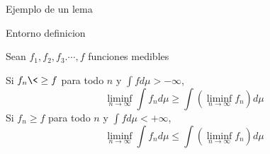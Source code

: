 \documentclass[]{beamer}
\theoremstyle{plain}
\begin{document}
\begin{frame}[fragile]{Ejemplo de un lema}
\begin{source}{Entorno definicion}{}
\begin{lema}
Sean $f_1, f_2, f_3. \cdots, f$ funciones medibles
\begin{enumerate}
\itemps Si $f_n\<\geq f$ para todo $n$ y $\int fd\mu > -\infty$, \\
$$\liminf_{n\rightarrow \infty} \int f_nd\mu\geq\int\left( \liminf_{n\rightarrow \infty} f_n \right)d\mu  $$
\itemps Si $f_n\geq f$ para todo $n$ y $\int fd\mu < +\infty$, \\
$$\liminf_{n\rightarrow \infty} \int f_nd\mu\leq\int\left( \liminf_{n\rightarrow \infty} f_n \right)d\mu  $$
\end{enumerate}
\end{lema}
\end{source}
\end{frame}
\end{document}
